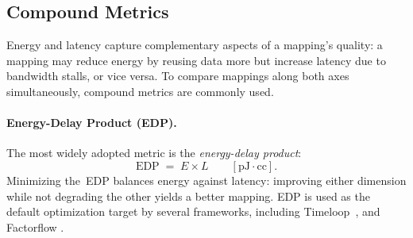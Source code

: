 \subsection{Compound Metrics}
\label{sec:compound-metrics}

Energy and latency capture complementary aspects of a mapping's quality:
a mapping may reduce energy by reusing data more but increase latency due
to bandwidth stalls, or vice versa.
To compare mappings along both axes simultaneously, compound metrics are
commonly used.

\paragraph{Energy-Delay Product (EDP).}
The most widely adopted metric is the \emph{energy-delay product}:
\begin{equation}
\label{eq:edp}
\text{EDP} \;=\; E \times L \qquad [\text{pJ}\cdot\text{cc}].
\end{equation}
Minimizing the~EDP balances energy against latency: improving either
dimension while not degrading the other yields a better mapping.
EDP is used as the default optimization target by several frameworks,
including Timeloop~\cite{parashar2019timeloop}, and Factorflow \cite{Factorflow} .
